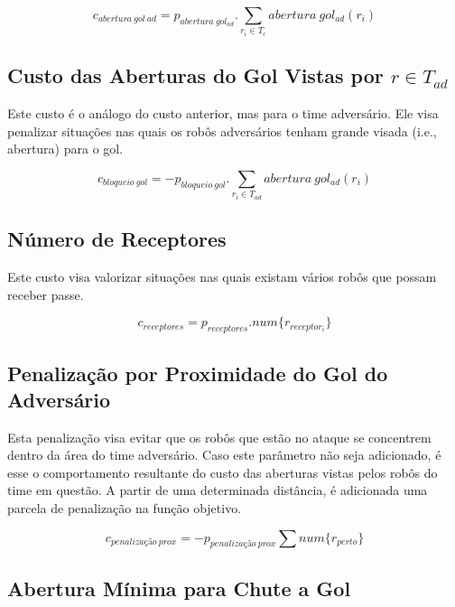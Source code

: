 \begin{dmath}
   c_{abertura{\ }gol{\ }ad} = p_{abertura{\ }gol_{ad}} .
    \sum_{r_i \in T_c} abertura{\ }gol_{ad}(r_i)
\end{dmath}

\subsection{Custo das Aberturas do Gol Vistas por $r\in T_{ad}$}

Este custo é o análogo do custo anterior, mas para o time adversário. Ele visa
penalizar situações nas quais os robôs adversários tenham grande visada (i.e.,
abertura) para o gol.

\begin{dmath}
   c_{bloqueio{\ }gol} = - p_{bloqueio{\ }gol} .
    \sum_{r_i \in T_{ad}} abertura{\ }gol_{ad}(r_i)
\end{dmath}

\subsection{Número de Receptores}

Este custo visa valorizar situações nas quais existam vários robôs que possam
receber passe.

\begin{dmath}
  c_{receptores} = p_{receptores} .
   num \lbrace r_{receptor_i} \rbrace
\end{dmath}

\subsection{Penalização por Proximidade do Gol do Adversário}

Esta penalização visa evitar que os robôs que estão no ataque se concentrem
dentro da área do time adversário. Caso este parâmetro não seja adicionado, é
esse o comportamento resultante do custo das aberturas vistas pelos robôs do
time em questão.  A partir de uma determinada distância, é adicionada uma
parcela de penalização na função objetivo.

\begin{dmath}
  c_{penalização{\ }prox} = - p_{penalização{\ }prox}
    \sum num \lbrace r_{perto} \rbrace
\end{dmath}

\subsection{Abertura Mínima para Chute a Gol}

